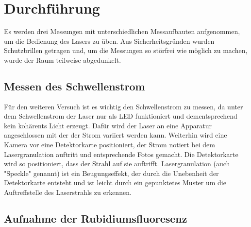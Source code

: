 \section{Durchführung}
\label{sec:Durchführung}
Es werden drei Messungen mit unterschiedlichen Messaufbauten aufgenommen, um die Bedienung des Lasers zu üben.
Aus Sicherheitsgründen wurden Schutzbrillen getragen und, um die Messungen so störfrei wie möglich zu machen,
wurde der Raum teilweise abgedunkelt.

\subsection{Messen des Schwellenstrom}
\label{sec:Schwellenstrom}
Für den weiteren Versuch ist es wichtig den Schwellenstrom zu messen, da unter dem Schwellenstrom der Laser nur
als LED funktioniert und dementsprechend kein kohärents Licht erzeugt. Dafür wird der Laser an eine Apparatur
angeschlossen mit der der Strom variiert werden kann. Weiterhin wird eine Kamera vor eine Detektorkarte
positioniert, der Strom notiert bei dem Lasergranulation auftritt und entsprechende Fotos gemacht.
Die Detektorkarte wird so positioniert, dass der Strahl auf sie auftrifft. Lasergranulation (auch "Speckle" genannt)
ist ein Beugungseffekt, der durch die Unebenheit der Detektorkarte entsteht und ist leicht durch ein gepunktetes
Muster um die Auftreffstelle des Laserstrahls zu erkennen.

\subsection{Aufnahme der Rubidiumsfluoresenz}
\label{sec:Rubidium}

